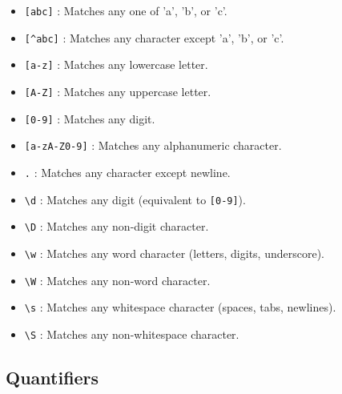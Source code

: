 \begin{itemize}

    \item \texttt{[abc]} : Matches any one of 'a', 'b', or 'c'.
    
    \item \texttt{[\^}\texttt{abc]} : Matches any character except 'a', 'b', or 'c'.

    \item \texttt{[a-z]} : Matches any lowercase letter.

    \item \texttt{[A-Z]} : Matches any uppercase letter.

    \item \texttt{[0-9]} : Matches any digit.

    \item \texttt{[a-zA-Z0-9]} : Matches any alphanumeric character.

    \item \texttt{.} : Matches any character except newline.

    \item \texttt{\textbackslash d} : Matches any digit (equivalent to \texttt{[0-9]}).

    \item \texttt{\textbackslash D} : Matches any non-digit character.

    \item \texttt{\textbackslash w} : Matches any word character (letters, digits, underscore).

    \item \texttt{\textbackslash W} : Matches any non-word character.

    \item \texttt{\textbackslash s} : Matches any whitespace character (spaces, tabs, newlines).

    \item \texttt{\textbackslash S} : Matches any non-whitespace character.

\end{itemize}

\subsection{Quantifiers}

